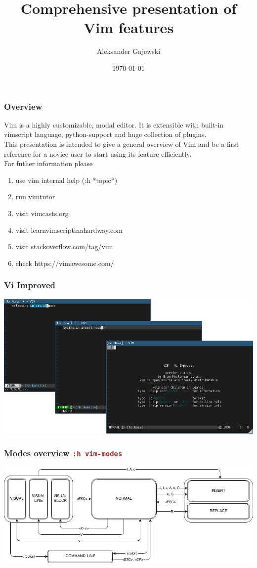 \documentclass{beamer}
\title[Vim Intro]{Comprehensive presentation of Vim features} %
\author{Aleksander Gajewski} %
\institute[None] %
{
\textit{adiog@brainfuck.pl} %
}
\date{\today} %
\newcommand{\vimcommand}[1]{\texttt{\textcolor{brown}{#1}}}
\newcommand{\vimhelp}[1]{\vimcommand{:h #1}}
\begin{document}
\begin{frame}
\titlepage %
\end{frame}

\begin{frame}
    \frametitle{Overview}
    Vim is a highly customizable, modal editor. It is extensible with built-in vimscript language, python-support and huge collection of plugins.\\
    This presentation is intended to give a general overview of Vim and be a first reference for a novice user to start using its feature efficiently.\\
    For futher information please
    \begin{enumerate} 
        \item use vim internal help (:h \textrm{*topic*})
        \item run vimtutor
        \item visit vimcasts.org
        \item visit learnvimscriptinahardway.com
        \item visit stackoverflow.com/tag/vim
        \item check https://vimawesome.com/
    \end{enumerate}
\end{frame}

\begin{frame}[fragile]
    \frametitle{Vi Improved}
    \includegraphics[width=\textwidth]{vim_screen.png}
\end{frame}

\begin{frame}[fragile]
    \frametitle{Modes overview \vimhelp{vim-modes}}
    \includegraphics[width=\textwidth]{vim_modes.png}
\end{frame}
\end{document}
